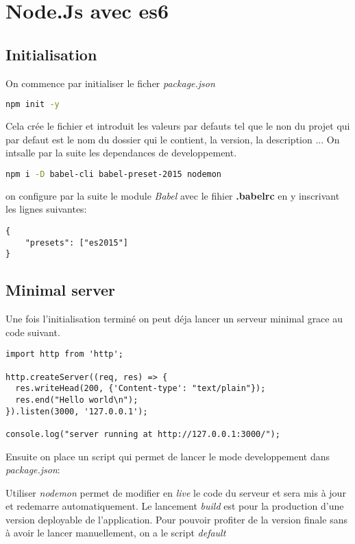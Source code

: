 \section{Node.Js avec es6}
\subsection{Initialisation}
On commence par initialiser le ficher \textit{package.json}
\begin{lstlisting}[language=bash]
	npm init -y
\end{lstlisting}
Cela crée le fichier et introduit les valeurs par defauts tel que le non du projet qui par defaut est le nom du dossier qui le contient, la version, la description ...
On intsalle par la suite les dependances de developpement.
\begin{lstlisting}[language=bash]
	npm i -D babel-cli babel-preset-2015 nodemon
\end{lstlisting}
on configure par la suite le module \textit{Babel} avec le fihier \textbf{.babelrc} en y inscrivant les lignes suivantes:
\begin{lstlisting}[style=htmlcssjs]
{
	"presets": ["es2015"]
}
\end{lstlisting}

\subsection{Minimal server}
Une fois l'initialisation terminé on peut déja lancer un serveur minimal grace au code suivant.
\begin{lstlisting}[style=htmlcssjs]
import http from 'http';

http.createServer((req, res) => {
  res.writeHead(200, {'Content-type': "text/plain"});
  res.end("Hello world\n");
}).listen(3000, '127.0.0.1');

console.log("server running at http://127.0.0.1:3000/");
\end{lstlisting}
Ensuite on place un script qui permet de lancer le mode developpement dans \textit{package.json}:

Utiliser \textit{nodemon} permet de modifier en \textit{live} le code du serveur et sera mis à jour et redemarre automatiquement.
Le lancement \textit{build} est pour la production d'une version deployable de l'application. Pour pouvoir profiter de la version finale sans à avoir le lancer manuellement, on a le script \textit{default}
